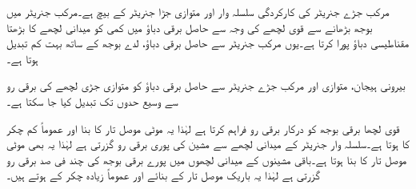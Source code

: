 مرکب جڑے جنریٹر کی کارکردگی سلسلہ وار اور متوازی جڑا جنریٹر کے بیچ ہے۔مرکب جنریٹر میں بوجھ بڑھانے سے قوی لچھے کی وجہ سے حاصل برقی دباؤ میں کمی کو میدانی لچھے کا بڑھتا مقناطیسی دباؤ پورا کرتا ہے۔یوں مرکب جنریٹر سے حاصل برقی دباؤ، لدے بوجھ کے ساتھ بہت کم تبدیل ہوتا ہے۔

بیرونی ہیجان، متوازی اور مرکب جڑے جنریٹر سے حاصل برقی دباؤ کو متوازی جڑی لچھے کی برقی رو  سے وسیع حدوں تک تبدیل کیا جا سکتا ہے۔

قوی لچھا برقی بوجھ کو درکار برقی رو فراہم کرتا ہے لہٰذا یہ موٹی موصل تار کا بنا اور عموماً کم چکر کا ہوتا ہے۔سلسلہ وار جنریٹر کے میدانی لچھے سے  مشین کی پوری  برقی رو  گزرتی ہے لہٰذا یہ بھی موٹی موصل تار کا بنا ہوتا ہے۔باقی مشینوں کے میدانی لچھوں میں پورے برقی بوجھ کی چند  فی صد برقی رو گزرتی ہے لہٰذا یہ باریک موصل تار کے بنائے اور عموماً زیادہ چکر کے ہوتے ہیں۔

